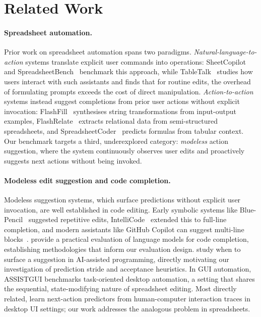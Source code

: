 \documentclass{article}
\theoremstyle{plain}
\theoremstyle{definition}
\theoremstyle{remark}
\begin{document}
\section{Related Work}

\paragraph{Spreadsheet automation.}
Prior work on spreadsheet automation spans two paradigms.
\emph{Natural-language-to-action} systems translate explicit user commands into operations: SheetCopilot~\citep{li2023sheetcopilot} and SpreadsheetBench~\citep{ma2024spreadsheetbench} benchmark this approach, while TableTalk~\citep{liang2025tabletalk} studies how users interact with such assistants and finds that for routine edits, the overhead of formulating prompts exceeds the cost of direct manipulation.
\emph{Action-to-action} systems instead suggest completions from prior user actions without explicit invocation: FlashFill~\citep{gulwani2011automating} synthesises string transformations from input-output examples, FlashRelate~\citep{barowy2015flashrelate} extracts relational data from semi-structured spreadsheets, and SpreadsheetCoder~\citep{chen2021spreadsheetcoder} predicts formulas from tabular context.
Our benchmark targets a third, underexplored category: \emph{modeless} action suggestion, where the system continuously observes user edits and proactively suggests next actions without being invoked.

\paragraph{Modeless edit suggestion and code completion.}
Modeless suggestion systems, which surface predictions without explicit user invocation, are well established in code editing.
Early symbolic systems like Blue-Pencil~\citep{miltner2019fly} suggested repetitive edits, IntelliCode~\citep{svyatkovskiy2020intellicode} extended this to full-line completion, and modern assistants like GitHub Copilot can suggest multi-line blocks~\citep{mastropaolo2023robustness}.
\citet{izadi2024language} provide a practical evaluation of language models for code completion, establishing methodologies that inform our evaluation design.
\citet{mozannar2024show} study when to surface a suggestion in AI-assisted programming, directly motivating our investigation of prediction stride and acceptance heuristics.
In GUI automation, ASSISTGUI \citep{gao2024assistgui} benchmarks task-oriented desktop automation, a setting that shares the sequential, state-modifying nature of spreadsheet editing.
Most directly related, \citet{shaikh2026learning} learn next-action predictors from human-computer interaction traces in desktop UI settings; our work addresses the analogous problem in spreadsheets.
\end{document}
